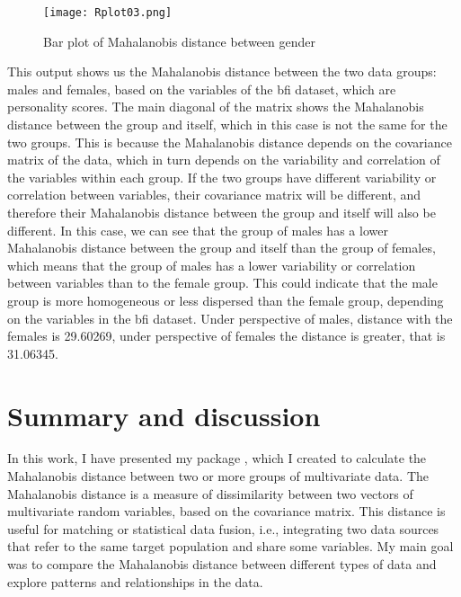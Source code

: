 \documentclass[article]{jss}
\begin{document}
\begin{figure}
    \centering
    \texttt{[image: Rplot03.png]}
    \caption{Bar plot of Mahalanobis distance between gender}
    \label{fig:barplot3}
\end{figure}

This output shows us the Mahalanobis distance between the two data groups: males and females, based on the variables of the bfi dataset, which are personality scores. The main diagonal of the matrix shows the Mahalanobis distance between the group and itself, which in this case is not the same for the two groups. This is because the Mahalanobis distance depends on the covariance matrix of the data, which in turn depends on the variability and correlation of the variables within each group. If the two groups have different variability or correlation between variables, their covariance matrix will be different, and therefore their Mahalanobis distance between the group and itself will also be different. In this case, we can see that the group of males has a lower Mahalanobis distance between the group and itself than the group of females, which means that the group of males has a lower variability or correlation between variables than to the female group. This could indicate that the male group is more homogeneous or less dispersed than the female group, depending on the variables in the bfi dataset. Under perspective of males, distance with the females is 29.60269, under perspective of females the distance is greater, that is 31.06345.


\section{Summary and discussion} \label{sec:summary}

In this work, I have presented my package , which I created to calculate the Mahalanobis distance between two or more groups of multivariate data. The Mahalanobis distance is a measure of dissimilarity between two vectors of multivariate random variables, based on the covariance matrix. This distance is useful for matching or statistical data fusion, i.e., integrating two data sources that refer to the same target population and share some variables. My main goal was to compare the Mahalanobis distance between different types of data and explore patterns and relationships in the data.
\end{document}
